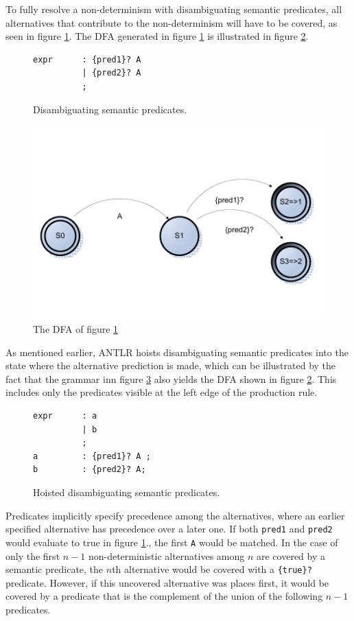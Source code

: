 To fully resolve a non-determinism with disambiguating semantic predicates, all alternatives that contribute to the non-determinism will have to be covered, as seen in figure \ref{code:disambigSemantic}. The DFA generated in figure \ref{code:disambigSemantic} is illustrated in figure \ref{fig:dfaDisambiguate}.

\begin{figure}[h!]
\begin{verbatim}
expr      : {pred1}? A 
          | {pred2}? A
          ;
\end{verbatim}
\caption{Disambiguating semantic predicates.}
\label{code:disambigSemantic}
\end{figure}

\begin{figure}[!h]
  \centering
    \includegraphics[scale=0.6]{img/disambigsemantic}
  \caption{The DFA of figure \ref{code:disambigSemantic}}
  \label{fig:dfaDisambiguate}
\end{figure}
As mentioned earlier, ANTLR hoists disambiguating semantic predicates into the state where the alternative prediction is made, which can be illustrated by the fact that the grammar inn figure \ref{code:disambigSemanticHoist} also yields the DFA shown in figure \ref{fig:dfaDisambiguate}. This includes only the predicates visible at the left edge of the production rule. 
\begin{figure}[h!]
\begin{verbatim}
expr      : a 
          | b
          ;
a         : {pred1}? A ;
b         : {pred2}? A;
\end{verbatim}
\caption{Hoisted disambiguating semantic predicates.}
\label{code:disambigSemanticHoist}
\end{figure}
Predicates implicitly specify precedence among the alternatives, where an earlier specified alternative has precedence over a later one. If both \verb!pred1! and \verb!pred2! would evaluate to true in figure \ref{code:disambigSemantic}., the first \verb!A! would be matched. In the case of only the first $n-1$ non-deterministic alternatives among $n$ are covered by a semantic predicate, the $n$th alternative would be covered with a \verb!{true}?! predicate. However, if this uncovered alternative was places first, it would be covered by a predicate that is the complement of the union of the following $n-1$ predicates.

